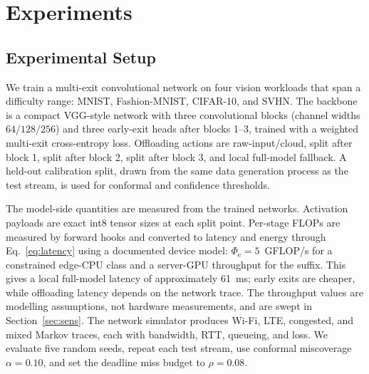 \documentclass[11pt]{article}
\newcommand{\LocalFullMs}{61}
\newcommand{\EdgeGflops}{5}
\begin{document}
\section{Experiments}

\subsection{Experimental Setup}

We train a multi-exit convolutional network on four vision workloads that span a
difficulty range: MNIST, Fashion-MNIST, CIFAR-10, and SVHN. The backbone is a
compact VGG-style network with three convolutional blocks (channel widths
$64/128/256$) and three early-exit heads after blocks 1--3, trained with a
weighted multi-exit cross-entropy loss. Offloading actions are raw-input/cloud,
split after block 1, split after block 2, split after block 3, and local
full-model fallback. A held-out calibration split, drawn from the same data
generation process as the test stream, is used for conformal and confidence
thresholds.

The model-side quantities are measured from the trained networks. Activation
payloads are exact int8 tensor sizes at each split point. Per-stage FLOPs are
measured by forward hooks and converted to latency and energy through
Eq.~\eqref{eq:latency} using a documented device model:
$\Phi_{\mathrm{e}}=\EdgeGflops$~GFLOP/s for a constrained edge-CPU class and a
server-GPU throughput for the suffix. This gives a local full-model latency of
approximately \LocalFullMs~ms; early exits are cheaper, while offloading latency
depends on the network trace. The throughput values are modelling assumptions,
not hardware measurements, and are swept in Section~\ref{sec:sens}. The network
simulator produces Wi-Fi, LTE, congested, and mixed Markov traces, each with
bandwidth, RTT, queueing, and loss. We evaluate five random seeds, repeat each
test stream, use conformal miscoverage $\alpha=0.10$, and set the deadline miss
budget to $\rho=0.08$.

\begin{table}[t]
\centering
\caption{Core experimental parameters. Deadlines are workload service-level
objectives; device and energy values are modelling assumptions used to convert
measured FLOPs and payloads into latency and energy.}
\label{tab:setup}
\end{table}
\end{document}
